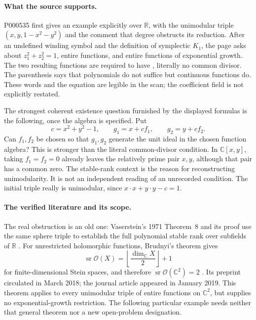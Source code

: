 \paragraph{What the source supports.}
P000535 first gives an example explicitly over \(\mathbb R\), with the
unimodular triple \((x,y,1-x^2-y^2)\) and the comment that degree obstructs its
reduction. After an undefined winding symbol and the definition of symplectic
\(K_1\), the page asks about \(z_1^2+z_2^2=1\), entire functions, and entire
functions of exponential growth. The two resulting functions are required to
have , literally no common divisor. The parenthesis
 says that polynomials do not suffice
but continuous functions do. These words and the equation are legible in the
scan; the coefficient field is not explicitly restated.

The strongest coherent existence question furnished by the displayed formulas
is the following, once the algebra is specified. Put
\[
 c=x^2+y^2-1,
 \qquad g_1=x+cf_1,\qquad g_2=y+cf_2.
\]
Can \(f_1,f_2\) be chosen so that \(g_1,g_2\) generate the unit ideal in the
chosen function algebra? This is stronger than the literal common-divisor
condition. In \(\mathbb C[x,y]\), taking \(f_1=f_2=0\) already leaves the
relatively prime pair \(x,y\), although that pair has a common zero. The
stable-rank context is the reason for reconstructing unimodularity. It is not
an independent reading of an unrecorded condition. The initial triple really
is unimodular, since \(x\cdot x+y\cdot y-c=1\).

\paragraph{The verified literature and its scope.}
The real obstruction is an old one: Vaserstein's 1971 Theorem~8 and its proof
use the same sphere triple to establish the full polynomial stable rank over
subfields of \(\mathbb R\) \citep[Russian p.~27]{vaserstein1971stable}.
For unrestricted holomorphic functions, Brudnyi's theorem gives
\[
 \operatorname{sr}\mathcal O(X)
   =\left\lfloor\frac{\dim_{\mathbb C}X}{2}\right\rfloor+1
\]
for finite-dimensional Stein spaces, and therefore
\(\operatorname{sr}\mathcal O(\mathbb C^2)=2\)
\citep[Theorem~1.1]{brudnyi2019stein}. Its preprint circulated in March 2018;
the journal article appeared in January 2019. This theorem applies to every
unimodular triple of entire functions on \(\mathbb C^2\), but supplies no
exponential-growth restriction. The following particular example needs neither
that general theorem nor a new open-problem designation.

